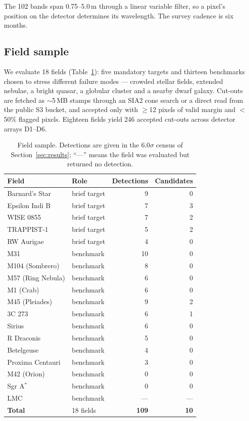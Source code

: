 \documentclass[11pt,a4paper]{article}
\begin{document}
{The 102 bands span 0.75--5.0\,\textmu m through a linear variable filter, so a pixel's position on
the detector determines its wavelength. The survey cadence is six months.

\subsection{Field sample}
We evaluate 18 fields (Table~\ref{tab:fields}): five mandatory targets and thirteen benchmarks
chosen to stress different failure modes --- crowded stellar fields, extended nebulae, a bright
quasar, a globular cluster and a nearby dwarf galaxy. Cut-outs are fetched as $\sim$5\,MB stamps
through an SIA2 cone search or a direct read from the public S3 bucket, and accepted only with
$\ge$12 pixels of valid margin and $<$50\% flagged pixels. Eighteen fields yield 246 accepted
cut-outs across detector arrays D1--D6.

\begin{table}[t]
\centering
\caption{Field sample. Detections are given in the 6.0$\sigma$ census of
Section~\ref{sec:results}; ``---'' means the field was evaluated but returned no detection.}
\label{tab:fields}
\small
\begin{tabular}{@{}llrr@{}}
\toprule
Field & Role & Detections & Candidates \\
\midrule
Barnard's Star      & brief target & 9 & 0 \\
Epsilon Indi B      & brief target & 7 & 3 \\
WISE 0855           & brief target & 7 & 2 \\
TRAPPIST-1          & brief target & 5 & 2 \\
RW Aurigae          & brief target & 4 & 0 \\
M31                 & benchmark    & 10 & 0 \\
M104 (Sombrero)     & benchmark    & 8 & 0 \\
M57 (Ring Nebula)   & benchmark    & 6 & 0 \\
M1 (Crab)           & benchmark    & 6 & 0 \\
M45 (Pleiades)      & benchmark    & 9 & 2 \\
3C 273              & benchmark    & 6 & 1 \\
Sirius              & benchmark    & 6 & 0 \\
R Draconis          & benchmark    & 5 & 0 \\
Betelgeuse          & benchmark    & 4 & 0 \\
Proxima Centauri    & benchmark    & 3 & 0 \\
M42 (Orion)         & benchmark    & 0 & 0 \\
Sgr A$^{*}$         & benchmark    & 0 & 0 \\
LMC                 & benchmark    & --- & --- \\
\midrule
\textbf{Total}      & 18 fields    & \textbf{109} & \textbf{10} \\
\bottomrule
\end{tabular}
\end{table}


}
\end{document}
